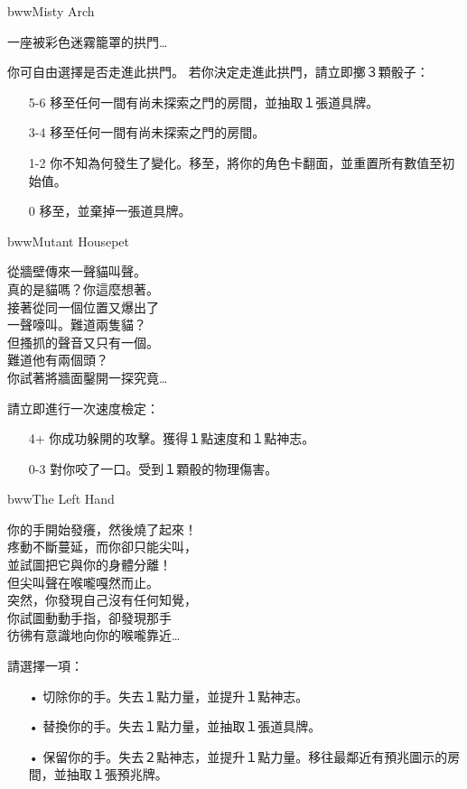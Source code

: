 \linebreak[0]%
\begin{EventCard}{bww}{Misty Arch}
	\begin{CardStory}
		一座被彩色迷霧籠罩的拱門…
	\end{CardStory}
	你可自由選擇是否走進此拱門。\smallbreak
	若你決定走進此拱門，請立即擲３顆骰子：
	\begin{itemize}
		\item[5-6] 移至任何一間有尚未探索之門的房間，並抽取１張道具牌。
		\item[3-4] 移至任何一間有尚未探索之門的房間。
		\item[1-2] 你不知為何發生了變化。移至，將你的角色卡翻面，並重置所有數值至初始值。
		\item[0] 移至，並棄掉一張道具牌。
	\end{itemize}
\end{EventCard}%
\linebreak[0]%
\begin{EventCard}{bww}{Mutant Housepet}
	\begin{CardStory}
		從牆壁傳來一聲貓叫聲。\\
		真的是貓嗎？你這麼想著。\\
		接著從同一個位置又爆出了\\
		一聲嚎叫。難道兩隻貓？\\
		但搔抓的聲音又只有一個。\\
		難道他有兩個頭？\\
		你試著將牆面鑿開一探究竟…
	\end{CardStory}
	請立即進行一次速度檢定：
	\begin{itemize}
		\item[4+] 你成功躲開\ThisName{}的攻擊。獲得１點速度和１點神志。
		\item[0-3] \ThisName{}對你咬了一口。受到１顆骰的物理傷害。
	\end{itemize}
\end{EventCard}%
\linebreak[0]%
\begin{EventCard}{bww}{The Left Hand}
	\begin{CardStory}
		你的手開始發癢，然後燒了起來！\\
		疼動不斷蔓延，而你卻只能尖叫，\\
		並試圖把它與你的身體分離！\\
		但尖叫聲在喉嚨嘎然而止。\\
		突然，你發現自己沒有任何知覺，\\
		你試圖動動手指，卻發現那手\\
		彷彿有意識地向你的喉嚨靠近…
	\end{CardStory}
	請選擇一項：
	\begin{itemize}
		\item[•] 切除你的手。失去１點力量，並提升１點神志。
		\item[•] 替換你的手。失去１點力量，並抽取１張道具牌。
		\item[•] 保留你的手。失去２點神志，並提升１點力量。移往最鄰近有預兆圖示的房間，並抽取１張預兆牌。
	\end{itemize}
\end{EventCard}%
